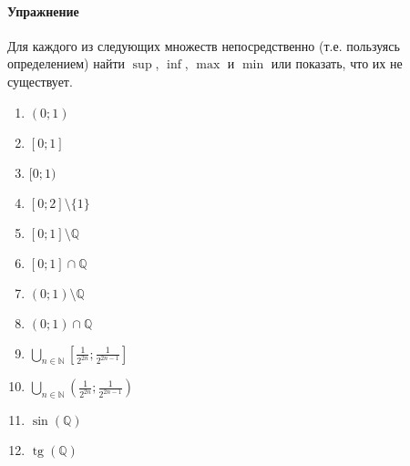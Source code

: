 \paragraph{Упражнение}

Для каждого из следующих множеств
непосредственно (т.е. пользуясь определением) найти $\sup$, $\inf$, $\max$ и $\min$
или показать, что их не существует.
\begin{enumerate}
	\item
		$(0;1)$
	\item
		$[0;1]$
	\item
		$[0;1)$
	\item
		$[0;2]\setminus\{1\}$
	\item
		$[0;1]\setminus\mathbb{Q}$
	\item
		$[0;1]\cap\mathbb{Q}$
	\item
		$(0;1)\setminus\mathbb{Q}$
	\item
		$(0;1)\cap\mathbb{Q}$
	\item
		$\bigcup\limits_{n\in\mathbb{N}}\left[\frac{1}{2^{2n}};\frac{1}{2^{2n-1}}\right]$
	\item
		$\bigcup\limits_{n\in\mathbb{N}}\left(\frac{1}{2^{2n}};\frac{1}{2^{2n-1}}\right)$
	\item
		$\sin(\mathbb{Q})$
	\item
		$\operatorname{tg}(\mathbb{Q})$
\end{enumerate}
